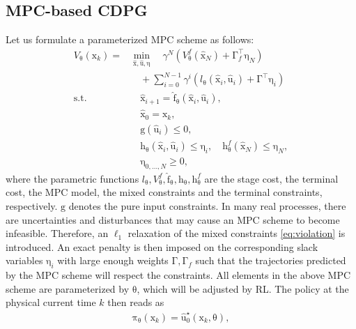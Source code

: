 \documentclass[10pt,twocolumn,twoside]{IEEEtran}
\newcommand{\vect}[1]{\ensuremath{\boldsymbol{\mathrm{#1}}}}
\begin{document}
\subsection{MPC-based CDPG}
Let us formulate a parameterized MPC scheme as follows:
	\begin{subequations}\label{eq:V0}
		\begin{align}
			V_{{\vect\theta} }(\vect x_k)=&\min_{\hat {\vect x},\hat {\vect u},\vect \eta }\quad \gamma^{N}\left(V^f_{\vect\theta}(\hat {\vect x}_N)+\vect \Gamma_{f}^\top\vect\eta_{N}\right) \nonumber\\
			&\quad +\sum_{i=0}^{N-1}\gamma^{i}\left(l_{\vect\theta}(\hat {\vect x}_i,\hat {\vect u}_i)+\vect \Gamma^\top\vect \eta_{i}\right)\label{eq:cost_mpc}\\
			\mathrm{s.t.}
                &\quad \hat {\vect x}_{i+1}=\vect {\hat f}_{\vect\theta}(\hat {\vect x}_i,\hat {\vect u}_i),\label{eq:mpc_model}\\
			&\quad\hat {\vect x}_0=\vect x_k, \label{eq:v2}\\
			&\quad \vect g(\hat {\vect u}_{i})\leq 0,\\
			&\quad \vect h_{\vect\theta}(\hat {\vect x}_{i},\hat {\vect u}_i)\leq \vect \eta_{i},\quad \vect h_{\vect\theta}^{f}(\hat {\vect x}_{N})\leq \vect \eta_{N}, \label{eq:violation} \\
			&\quad \vect\eta_{0,\ldots,N} \geq 0, \label{eq:slack}
		\end{align}
	\end{subequations}
where the parametric functions $l_{\vect\theta},V^f_{\vect\theta},\vect {\hat f}_{\vect\theta},\vect h_{\vect\theta},\vect h_{\vect\theta}^{f}$ are the stage cost, the terminal cost, the MPC model, the mixed constraints and the terminal constraints, respectively. $\vect g$ denotes the pure input constraints. In many real processes, there are uncertainties and disturbances that may cause an MPC scheme to become infeasible. Therefore, an $\ell_1$ relaxation of the mixed constraints \eqref{eq:violation} is introduced. An exact penalty is then imposed on the corresponding slack variables $\vect \eta_i$ with large enough weights $\vect \Gamma,\vect \Gamma_f$ such that the trajectories predicted by the MPC scheme will respect the constraints. All elements in the above MPC scheme are parameterized by $\vect\theta$, which will be adjusted by RL. The policy at the physical current time $k$ then reads as
	\begin{gather}\label{eq:Policy}
		\vect\pi_{\vect\theta}(\vect x_k)=\hat {\vect u}_0^\star\left(\vect x_k,\vect\theta\right),
	\end{gather}
\end{document}
